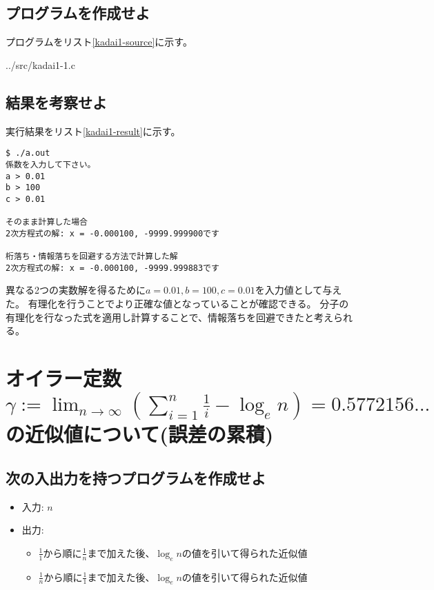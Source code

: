 \documentclass[]{jsarticle}
\begin{document}
\subsection{プログラムを作成せよ}

プログラムをリスト\ref{kadai1-source}に示す。


{../src/kadai1-1.c}

\clearpage

\subsection{結果を考察せよ}

実行結果をリスト\ref{kadai1-result}に示す。

\begin{lstlisting}[caption=実行結果,label=kadai1-result]
$ ./a.out
係数を入力して下さい。
a > 0.01
b > 100
c > 0.01

そのまま計算した場合
2次方程式の解: x = -0.000100, -9999.999900です

桁落ち・情報落ちを回避する方法で計算した解
2次方程式の解: x = -0.000100, -9999.999883です
\end{lstlisting}

異なる2つの実数解を得るために$a=0.01, b=100, c=0.01$を入力値として与えた。
有理化を行うことでより正確な値となっていることが確認できる。
分子の有理化を行なった式を適用し計算することで、情報落ちを回避できたと考えられる。


\section{オイラー定数$\gamma:=\lim_{n \to \infty} \left(\sum_{i=1}^{n} \frac{1}{i} - \log_{e} n\right)=0.5772156...$の近似値について(誤差の累積)}

\subsection{次の入出力を持つプログラムを作成せよ}

\begin{itemize}
\item 入力: $n$
\item 出力:
\begin{itemize}
\item $\frac{1}{1}$から順に$\frac{1}{n}$まで加えた後、$\log_{e} n$の値を引いて得られた近似値
\item $\frac{1}{n}$から順に$\frac{1}{1}$まで加えた後、$\log_{e} n$の値を引いて得られた近似値
\end{itemize}
\end{itemize}
\end{document}
